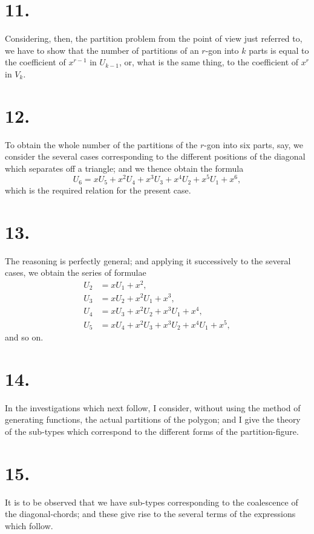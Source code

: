 \documentclass[11pt,a4paper]{article}
\begin{document}
\section*{11.}
Considering, then, the partition problem from the point of view just referred to, we have to show that the number of partitions of an $r$-gon into $k$ parts is equal to the coefficient of $x^{r-1}$ in $U_{k-1}$, or, what is the same thing, to the coefficient of $x^r$ in $V_k$.

\section*{12.}
To obtain the whole number of the partitions of the $r$-gon into six parts, say, we consider the several cases corresponding to the different positions of the diagonal which separates off a triangle; and we thence obtain the formula
\[
U_6 = xU_5 + x^2U_4 + x^3U_3 + x^4U_2 + x^5U_1 + x^6,
\]
which is the required relation for the present case.

\section*{13.}
The reasoning is perfectly general; and applying it successively to the several cases, we obtain the series of formulae
\begin{align*}
U_2 &= xU_1 + x^2, \\
U_3 &= xU_2 + x^2U_1 + x^3, \\
U_4 &= xU_3 + x^2U_2 + x^3U_1 + x^4, \\
U_5 &= xU_4 + x^2U_3 + x^3U_2 + x^4U_1 + x^5,
\end{align*}
and so on.

\section*{14.}
In the investigations which next follow, I consider, without using the method of generating functions, the actual partitions of the polygon; and I give the theory of the sub-types which correspond to the different forms of the partition-figure.

\section*{15.}
It is to be observed that we have sub-types corresponding to the coalescence of the diagonal-chords; and these give rise to the several terms of the expressions which follow.
\end{document}
